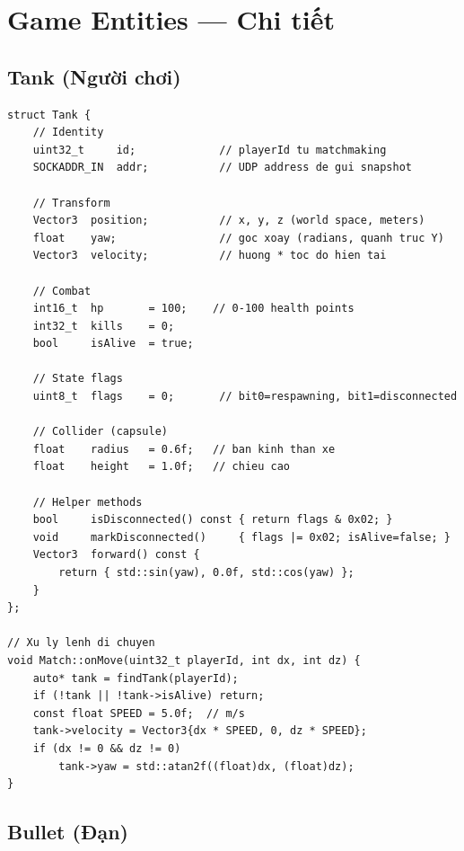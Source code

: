 \documentclass[12pt,a4paper]{report}
\begin{document}
\section{Game Entities --- Chi tiết}

\subsection{Tank (Người chơi)}

\begin{lstlisting}[style=cppStyle, caption={Tank entity --- đầy đủ fields và methods}, label={lst:tank}]
struct Tank {
    // Identity
    uint32_t     id;             // playerId tu matchmaking
    SOCKADDR_IN  addr;           // UDP address de gui snapshot

    // Transform
    Vector3  position;           // x, y, z (world space, meters)
    float    yaw;                // goc xoay (radians, quanh truc Y)
    Vector3  velocity;           // huong * toc do hien tai

    // Combat
    int16_t  hp       = 100;    // 0-100 health points
    int32_t  kills    = 0;
    bool     isAlive  = true;

    // State flags
    uint8_t  flags    = 0;       // bit0=respawning, bit1=disconnected

    // Collider (capsule)
    float    radius   = 0.6f;   // ban kinh than xe
    float    height   = 1.0f;   // chieu cao

    // Helper methods
    bool     isDisconnected() const { return flags & 0x02; }
    void     markDisconnected()     { flags |= 0x02; isAlive=false; }
    Vector3  forward() const {
        return { std::sin(yaw), 0.0f, std::cos(yaw) };
    }
};

// Xu ly lenh di chuyen
void Match::onMove(uint32_t playerId, int dx, int dz) {
    auto* tank = findTank(playerId);
    if (!tank || !tank->isAlive) return;
    const float SPEED = 5.0f;  // m/s
    tank->velocity = Vector3{dx * SPEED, 0, dz * SPEED};
    if (dx != 0 && dz != 0)
        tank->yaw = std::atan2f((float)dx, (float)dz);
}
\end{lstlisting}

\subsection{Bullet (Đạn)}
\end{document}
